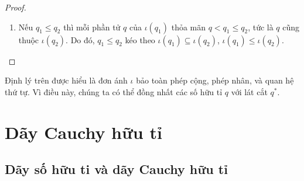 \begin{proof}
\begin{enumerate}[label={(\roman*)}]
\begin{enumerate}[label={\textbf{Trường hợp \arabic*.}},itemindent=2cm]
                        Như vậy $\iota(q_{1}q_{2}) = \iota(q_{1})\iota(q_{2})$ với mọi số hữu tỉ âm $q_{1}$ và số hữu tỉ dương $q_{2}$.
                  \item  $q_{1} < 0$ và $q_{2} < 0$.
                        \begin{align*}
                            \iota(q_{1}q_{2}) & = \iota((-q_{1})(-q_{2}))                                                                          \\
                                              & = \iota(-q_{1})\iota(-q_{2})      & \text{(theo \textbf{Trường hợp 2})}                            \\
                                              & = (-\iota(q_{1}))(-\iota(-q_{2}))                                                                  \\
                                              & = \iota(q_{1})\iota(q_{2})        & \text{(theo Mệnh đề~\ref{proposition:dedekind-cuts-and-sign})}
                        \end{align*}

                        Như vậy $\iota(q_{1}q_{2}) = \iota(q_{1})\iota(q_{2})$ với mọi số hữu tỉ âm $q_{1}, q_{2}$.
              \end{enumerate}

              Vậy $\iota(q_{1}q_{2}) = \iota(q_{1})\iota(q_{2})$ với mọi số hữu tỉ $q_{1}, q_{2}$.
        \item Nếu $q_{1}\leq q_{2}$ thì mỗi phần tử $q$ của $\iota(q_{1})$ thỏa mãn $q < q_{1}\leq q_{2}$, tức là $q$ cũng thuộc $\iota(q_{2})$. Do đó, $q_{1}\leq q_{2}$ kéo theo $\iota(q_{1})\subseteq \iota(q_{2})$, $\iota(q_{1})\leq \iota(q_{2})$.
    \end{enumerate}
\end{proof}

Định lý trên được hiểu là đơn ánh $\iota$ bảo toàn phép cộng, phép nhân, và quan hệ thứ tự. Vì điều này, chúng ta có thể đồng nhất các số hữu tỉ $q$ với lát cắt $q^{*}$.

\section{Dãy Cauchy hữu tỉ}\label{section:rational-cauchy-sequences}

\subsection{Dãy số hữu ti và dãy Cauchy hữu tỉ}

